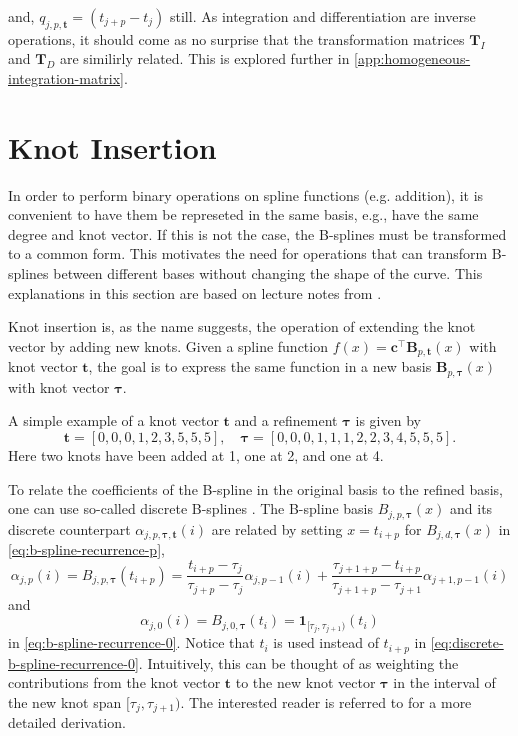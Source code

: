 and, $q_{j,p,\mathbf{t}} = (t_{j+p}-t_j)$ still.
As integration and differentiation are inverse operations, it should come as no surprise that the transformation matrices $\mathbf T_I$ and $\mathbf T_D$ are similirly related. This is explored further in \cref{app:homogeneous-integration-matrix}.


\section{Knot Insertion}
In order to perform binary operations on spline functions (e.g. addition), it is convenient to have them be represeted in the same basis, e.g., have the same degree and knot vector. If this is not the case, the B-splines must be transformed to a common form. This motivates the need for operations that can transform B-splines between different bases without changing the shape of the curve. This explanations in this section are based on lecture notes from \cite{bspline-uio}.

Knot insertion is, as the name suggests, the operation of extending the knot vector by adding new knots. Given a spline function $f(x) = \mathbf{c}^{\top} \mathbf{B}_{p, \mathbf{t}}(x)$ with knot vector $\mathbf t$, the goal is to express the same function in a new basis $\mathbf{B}_{p, \boldsymbol{\tau}}(x)$ with knot vector $\boldsymbol{\tau}$.

A simple example of a knot vector $\mathbf t$ and a refinement $\boldsymbol \tau$ is given by
$$
    \mathbf t = [0, 0, 0, 1, 2, 3, 5, 5, 5], \quad \boldsymbol \tau = [0, 0, 0, 1, 1, 1, 2, 2, 3, 4, 5, 5, 5].
$$
Here two knots have been added at 1, one at 2, and one at 4.

To relate the coefficients of the B-spline in the original basis to the refined basis, one can use so-called discrete B-splines \citep{Cohen1980}.  The B-spline basis $B_{j, p, \boldsymbol{\tau}}(x)$ and its discrete counterpart $\alpha_{j,p, \boldsymbol{\tau}, \mathbf t}(i)$ are related by setting $x = t_{i+p}$ for $B_{j, d, \boldsymbol{\tau}}(x)$ in \cref{eq:b-spline-recurrence-p}, 
\begin{equation}\label{eq:discrete-b-spline-recurrence-p}
    \alpha_{j,p}(i) = B_{j, p, \boldsymbol{\tau}}(t_{i+p}) = 
    \frac{t_{i+p}-\tau_j}{\tau_{j+p}-\tau_j} \alpha_{j,p-1}(i) + \frac{\tau_{j+1+p}-t_{i+p}}{\tau_{j+1+p}-\tau_{j+1}} \alpha_{j+1,p-1}(i)
\end{equation}
and 
\begin{equation}\label{eq:discrete-b-spline-recurrence-0}
\alpha_{j,0}(i) = B_{j, 0, \boldsymbol{\tau}}(t_{i}) = \mathbf 1_{[\tau_j, \tau_{j+1})}(t_{i})
\end{equation}
 in \cref{eq:b-spline-recurrence-0}. Notice that $t_i$ is used instead of $t_{i+p}$ in \cref{eq:discrete-b-spline-recurrence-0}. Intuitively, this can be thought of as weighting the contributions from the knot vector $\mathbf t$ to the new knot vector $\boldsymbol \tau$ in the interval of the new knot span $[\tau_j, \tau_{j+1})$. The interested reader is referred to \cite{bspline-uio} for a more detailed derivation.


